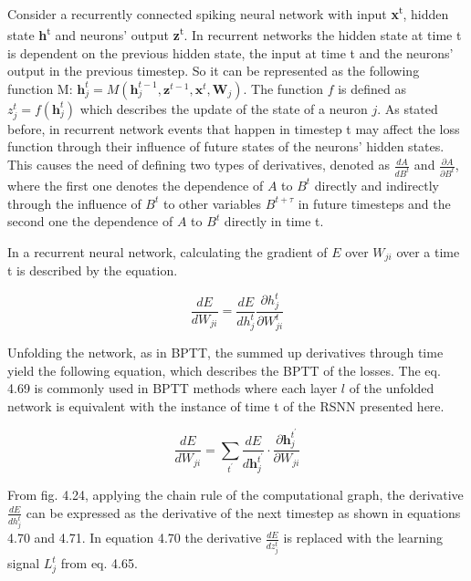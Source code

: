 \documentclass[12pt]{report}
\begin{document}
Consider a recurrently connected spiking neural network with input \textbf{x}\textsuperscript{t}, hidden state \textbf{h}\textsuperscript{t} and neurons' output \textbf{z}\textsuperscript{t}. In recurrent networks the hidden state at time t is dependent on the previous hidden state, the input at time t and the neurons' output in the previous timestep. So it can be represented as the following function M: $\mathbf{h}_{j}^{t}=M\left(\mathbf{h}_{j}^{t-1}, \mathbf{z}^{t-1}, \mathbf{x}^{t}, \mathbf{W}_{j}\right)$. The function \(f\) is defined as $z_{j}^{t}=f\left(\mathbf{h}_{j}^{t}\right)$ which describes the update of the state of a neuron \(j\). As stated before, in recurrent network events that happen in timestep t may affect the loss function through their influence of future states of the neurons' hidden states. This causes the need of defining two types of derivatives, denoted as \(\frac{dA}{dB^t}\) and \(\frac{\partial A}{\partial B^t}\), where the first one denotes the dependence of \(A\) to \(B^t\) directly and indirectly through the influence of \(B^t\) to other variables \(B^{t+\tau}\) in future timesteps and the second one the dependence of \(A\) to \(B^t\) directly in time t.

In a recurrent neural network, calculating the gradient of \(E\) over \(W_{ji}\) over a time t is described by the equation.

\begin{equation}
    \frac{d E}{d W_{ji}}=\frac{d E}{d h_{j}^{t}} \frac{\partial h_j^{t}}{\partial W_{ji}^{t}}
\end{equation}

Unfolding the network, as in BPTT, the summed up derivatives through time yield the following equation, which describes the BPTT of the losses. The eq. 4.69 is commonly used in BPTT methods where each layer \(l\) of the unfolded network is equivalent with the instance of time t of the RSNN presented here.

\begin{equation}
    \frac{d E}{d W_{j i}}=\sum_{t^{\prime}} \frac{d E}{d \mathbf{h}_{j}^{t^\prime}} \cdot \frac{\partial \mathbf{h}_{j}^{t^\prime}}{\partial W_{j i}}
\end{equation}

From fig. 4.24, applying the chain rule of the computational graph, the derivative \(\frac{d E}{d h_{j}^{t}}\) can be expressed as the derivative of the next timestep as shown in equations 4.70 and 4.71. In equation 4.70 the derivative \(\frac{d E}{d z_{j}^{t}}\) is replaced with the learning signal \(L_j^t\) from eq. 4.65.
\end{document}

